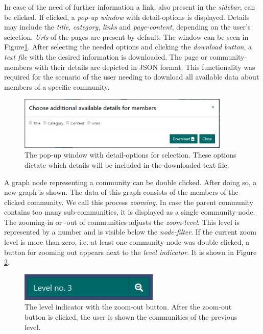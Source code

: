 In case of the need of further information a link, also present in the \textit{sidebar}, can be clicked. If clicked, a \textit{pop-up window} with detail-options is displayed. Details may include the \textit{title}, \textit{category}, \textit{links} and \textit{page-content}, depending on the user's selection. \textit{Urls} of the pages are present by default. The window can be seen in Figure\ref{detailsOptionsPopup}. After selecting the needed options and clicking the \textit{download button}, a \textit{text file} with the desired information is downloaded. The page or community-members with their details are depicted in JSON format. This functionality was required for the scenario of the user needing to download all available data about members of a specific community.
\begin{figure}[ht!]
  \centering
  \includegraphics[width=0.9\textwidth]{Images/options_popup.png}
  \caption{The pop-up window with detail-options for selection. These options dictate which details will be included in the downloaded text file.}
  \label{detailsOptionsPopup}
\end{figure} 

A graph node representing a community can be double clicked. After doing so, a new graph is shown. The data of this graph consists of the members of the clicked community. We call this process \textit{zooming}. In case the parent community contains too many sub-communities, it is displayed as a single community-node. The zooming-in or -out of communities adjusts the \textit{zoom-level}. This level is represented by a number and is visible below the \textit{node-filter}. If the current zoom level is more than zero, i.e. at least one community-node was double clicked, a button for zooming out appears next to the \textit{level indicator}. It is shown in Figure \ref{levelIndicatorWithButton}.
\begin{figure}[ht!]
  \centering
  \includegraphics{Images/levelIndicatorWithButton.png}
  \caption{The level indicator with the zoom-out button. After the zoom-out button is clicked, the user is shown the communities of the previous level.}
  \label{levelIndicatorWithButton}
\end{figure} 

